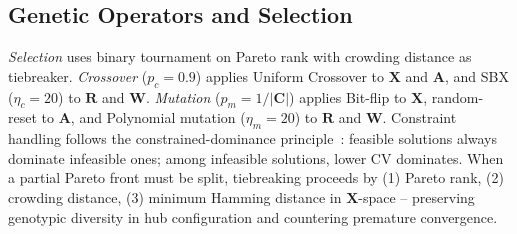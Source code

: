 \documentclass{llncs}
\begin{document}
\subsection{Genetic Operators and Selection}

\emph{Selection} uses binary tournament on Pareto rank with crowding distance as tiebreaker. \emph{Crossover} ($p_c = 0.9$) applies Uniform Crossover to $\mathbf{X}$ and $\mathbf{A}$, and SBX ($\eta_c = 20$) to $\mathbf{R}$ and $\mathbf{W}$. \emph{Mutation} ($p_m = 1/|\mathbf{C}|$) applies Bit-flip to $\mathbf{X}$, random-reset to $\mathbf{A}$, and Polynomial mutation ($\eta_m = 20$) to $\mathbf{R}$ and $\mathbf{W}$. Constraint handling follows the constrained-dominance principle~\cite{deb2002fast}: feasible solutions always dominate infeasible ones; among infeasible solutions, lower CV dominates. When a partial Pareto front must be split, tiebreaking proceeds by (1) Pareto rank, (2) crowding distance, (3) minimum Hamming distance in $\mathbf{X}$-space -- preserving genotypic diversity in hub configuration and countering premature convergence.
\end{document}
